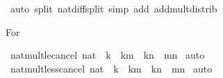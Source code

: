 \begin{isabellebody}
%
\isadelimproof
%
\endisadelimproof
%
\isatagproof
{}\isamarkupfalse%
\ {\isacharparenleft}{\kern0pt}auto\ split{\isacharcolon}{\kern0pt}\ nat{\isacharunderscore}{\kern0pt}diff{\isacharunderscore}{\kern0pt}split\ simp\ add{\isacharcolon}{\kern0pt}\ add{\isacharunderscore}{\kern0pt}mult{\isacharunderscore}{\kern0pt}distrib{\isacharparenright}{\kern0pt}%
\endisatagproof
{\isafoldproof}%
%
\isadelimproof
%
\endisadelimproof
%
\begin{isamarkuptext}%
For %
\end{isamarkuptext}\isamarkuptrue%
\isamarkupfalse%
\ nat{\isacharunderscore}{\kern0pt}mult{\isacharunderscore}{\kern0pt}le{\isacharunderscore}{\kern0pt}cancel{}{\isacharcolon}{\kern0pt}\ {\isachardoublequoteopen}{\isacharparenleft}{\kern0pt}{}{\isacharcolon}{\kern0pt}{\isacharcolon}{\kern0pt}nat{\isacharparenright}{\kern0pt}\ {\isacharless}{\kern0pt}\ k\ {\isacharequal}{\kern0pt}{\isacharequal}{\kern0pt}{\isachargreater}{\kern0pt}\ {\isacharparenleft}{\kern0pt}k{\isacharasterisk}{\kern0pt}m\ {\isacharless}{\kern0pt}{\isacharequal}{\kern0pt}\ k{\isacharasterisk}{\kern0pt}n{\isacharparenright}{\kern0pt}\ {\isacharequal}{\kern0pt}\ {\isacharparenleft}{\kern0pt}m{\isacharless}{\kern0pt}{\isacharequal}{\kern0pt}n{\isacharparenright}{\kern0pt}{\isachardoublequoteclose}\isanewline
%
\isadelimproof
%
\endisadelimproof
%
\isatagproof
{}\isamarkupfalse%
\ auto%
\endisatagproof
{\isafoldproof}%
%
\isadelimproof
\isanewline
%
\endisadelimproof
\isanewline
{}\isamarkupfalse%
\ nat{\isacharunderscore}{\kern0pt}mult{\isacharunderscore}{\kern0pt}less{\isacharunderscore}{\kern0pt}cancel{}{\isacharcolon}{\kern0pt}\ {\isachardoublequoteopen}{\isacharparenleft}{\kern0pt}{}{\isacharcolon}{\kern0pt}{\isacharcolon}{\kern0pt}nat{\isacharparenright}{\kern0pt}\ {\isacharless}{\kern0pt}\ k\ {\isacharequal}{\kern0pt}{\isacharequal}{\kern0pt}{\isachargreater}{\kern0pt}\ {\isacharparenleft}{\kern0pt}k{\isacharasterisk}{\kern0pt}m\ {\isacharless}{\kern0pt}\ k{\isacharasterisk}{\kern0pt}n{\isacharparenright}{\kern0pt}\ {\isacharequal}{\kern0pt}\ {\isacharparenleft}{\kern0pt}m{\isacharless}{\kern0pt}n{\isacharparenright}{\kern0pt}{\isachardoublequoteclose}\isanewline
%
\isadelimproof
%
\endisadelimproof
%
\isatagproof
{}\isamarkupfalse%
\ auto%
\endisatagproof
{\isafoldproof}%
%
\isadelimproof
\isanewline
%
\endisadelimproof
\isanewline
{}\isamarkupfalse%

\end{isabellebody}
